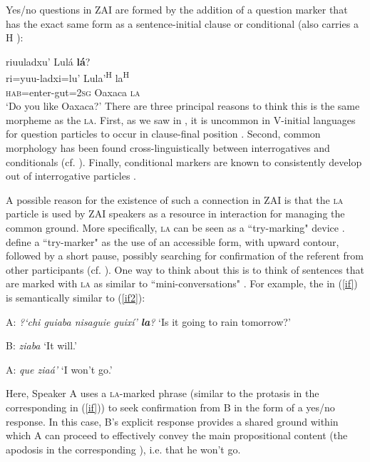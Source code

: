 Yes/no questions in ZAI are formed by the addition of a question marker that has the exact same form as a sentence-initial  clause or conditional (also carries a H ):

\ea\label{yes/no}
riuuladxu' Lul\'{a} \textbf{l\'{a}}? \\
ri=yuu-ladxi=lu' Lula'\textsuperscript{H} la\textsuperscript{H}  \\
\textsc{hab}=enter-gut=2\textsc{sg} Oaxaca \textsc{la}  \\
\glt `Do you like Oaxaca?' 
\z
There are three principal reasons to think this is the same morpheme as the  \textsc{la}. First, as we saw in , it is uncommon in V-initial languages for question particles to occur in clause-final position \citep{payne1990}. Second, common morphology has been found cross-linguistically between interrogatives and conditionals (cf. \citealt{haiman1978}). Finally, conditional markers are known to consistently develop out of interrogative particles \citep[296]{konig2007}.

A possible reason for the existence of such a connection in ZAI is that the \textsc{la} particle is used by ZAI speakers as a resource in interaction for managing the common ground. More specifically, \textsc{la} can be seen as a ``try-marking" device \citep{sacks1974}. \citet{sacks1974} define a ``try-marker" as the use of an accessible form, with upward  contour, followed by a short pause, possibly searching for confirmation of the referent from other participants (cf. \citealt{pekarek2011}). One way to think about this is to think of sentences that are marked with \textsc{la} as similar to ``mini-conversations" \citep[292]{thompson2007}. For example, the  in (\ref{if}) is semantically similar to (\ref{if2}):

\ea\label{if2}
A: \textit{{?`}chi guiaba nisaguie guix\'{i}' \textbf{la}?}  
 `Is it going to rain tomorrow?'

B: \textit{ziaba} 
 `It will.'

A: \textit{que zia\'{a}'} 
`I won't go.' 

\z

Here, Speaker A uses a \textsc{la}-marked phrase (similar to the protasis in the corresponding  in (\ref{if})) to seek confirmation from B in the form of a yes/no response. In this case, B's explicit response provides a shared ground within which A can proceed to effectively convey the main propositional content (the apodosis in the corresponding ), i.e. that he won't go. 

